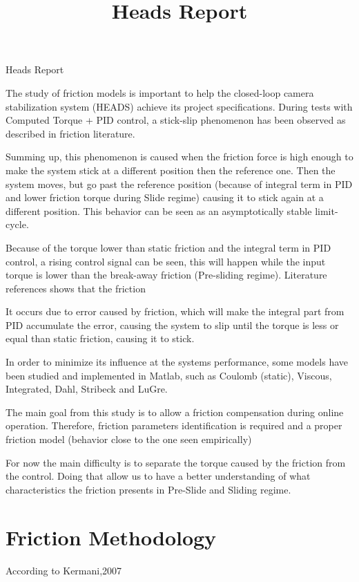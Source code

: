 \documentclass{paper}
\begin{document}
 \title{Heads Report}
Heads Report

The study of friction models is important to help the closed-loop camera stabilization system (HEADS) achieve its project specifications. During tests with Computed Torque + PID control, a stick-slip phenomenon has been observed as described in friction literature.

Summing up, this phenomenon is caused when the friction force is high enough to make the system stick at a different position then the reference one. Then the system moves, but go past the reference position (because of integral term in PID and lower friction torque during Slide regime) causing it to stick again at a different position. This behavior can be seen as an asymptotically stable limit-cycle.

Because of the torque lower than static friction and the integral term in PID control, a rising control signal can be seen, this will happen while the input torque is lower than the break-away friction (Pre-sliding regime). Literature references shows that the friction   

It occurs due to error caused by friction, which will make the integral part from PID accumulate the error, causing the system to slip until the torque is less or equal than static friction, causing it to stick.
    
In order to minimize its influence at the systems performance, some models have been studied and implemented in Matlab, such as Coulomb (static), Viscous, Integrated, Dahl, Stribeck and LuGre.

The main goal from this study is to allow a friction compensation during online operation. Therefore, friction parameters identification is required and a proper friction model (behavior close to the one seen empirically)

For now the main difficulty is to separate the torque caused by the friction from the control. Doing that allow us to have a better understanding of what characteristics the friction presents in Pre-Slide and Sliding regime.


    \section{Friction Methodology}
    According to Kermani,2007 
\end{document}
